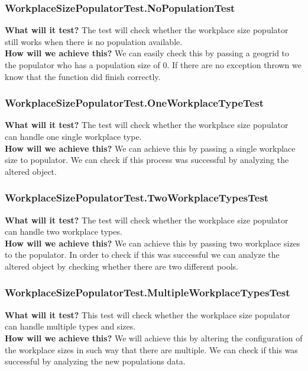 \documentclass{article}
\begin{document}
\subsubsection{WorkplaceSizePopulatorTest.NoPopulationTest}
\textbf{What will it test?}
The test will check whether the workplace size populator still works when there is no population available.\\
\newline
\textbf{How will we achieve this?}
We can easily check this by passing a geogrid to the populator who has a population size of 0. If there are no exception thrown we know that the function did finish correctly.

\subsubsection{WorkplaceSizePopulatorTest.OneWorkplaceTypeTest}
\textbf{What will it test?}
The test will check whether the workplace size populator can handle one single workplace type.\\
\newline
\textbf{How will we achieve this?}
We can achieve this by passing a single workplace size to populator. We can check if this process was successful by analyzing the altered object.

\subsubsection{WorkplaceSizePopulatorTest.TwoWorkplaceTypesTest}
\textbf{What will it test?}
The test will check whether the workplace size populator can handle two workplace types.\\
\newline
\textbf{How will we achieve this?} 
We can achieve this by passing two workplace sizes to the populator. In order to check if this was successful we can analyze the altered object by checking whether there are two different pools.

\subsubsection{WorkplaceSizePopulatorTest.MultipleWorkplaceTypesTest}
\textbf{What will it test?}
This test will check whether the workplace size populator can handle multiple types and sizes. \\
\newline
\textbf{How will we achieve this?}
We will achieve this by altering the configuration of the workplace sizes in such way that there are multiple. We can check if this was successful by analyzing the new populations data.
\end{document}
